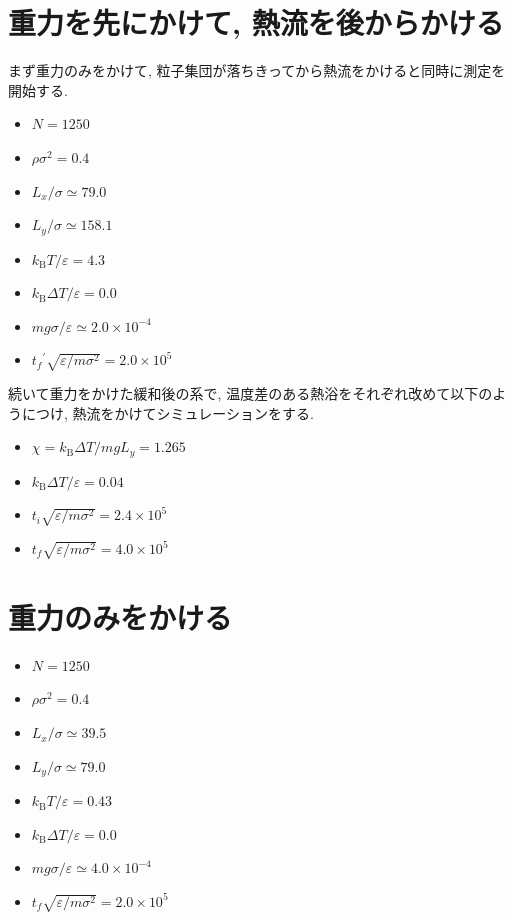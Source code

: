 


\section{重力を先にかけて, 熱流を後からかける}

まず重力のみをかけて, 粒子集団が落ちきってから熱流をかけると同時に測定を開始する.

\begin{itemize}
  \item $N = 1250$
  \item $\rho \sigma^2 = 0.4$
  \item $L_x / \sigma \simeq 79.0$
  \item $L_y / \sigma \simeq 158.1$
  \item $k_{\text{B}} T/\varepsilon = 4.3$
  \item $k_{\text{B}} \Delta T/\varepsilon = 0.0$
  \item $mg\sigma/\varepsilon \simeq 2.0 \times 10^{-4}$
  \item ${t_f}^{\prime} \sqrt{\varepsilon / m \sigma^2} = 2.0 \times 10^{5}$
\end{itemize}

続いて重力をかけた緩和後の系で, 温度差のある熱浴をそれぞれ改めて以下のようにつけ, 熱流をかけてシミュレーションをする. 

\begin{itemize}
  \item $\chi = k_{\text{B}}\Delta T / mg L_y = 1.265$
  \item $k_{\text{B}} \Delta T/\varepsilon = 0.04$
  \item $t_i \sqrt{\varepsilon / m \sigma^2} = 2.4 \times 10^{5}$
  \item $t_f \sqrt{\varepsilon / m \sigma^2} = 4.0 \times 10^{5}$
\end{itemize}





\section{重力のみをかける}

\begin{itemize}
  \item $N = 1250$
  \item $\rho {\sigma}^2 = 0.4$
  \item $L_x / \sigma \simeq 39.5$
  \item $L_y / \sigma \simeq 79.0$
  \item $k_{\text{B}} T / \varepsilon = 0.43$
  \item $k_{\text{B}} \Delta T / \varepsilon = 0.0$
  \item $mg\sigma/\varepsilon \simeq 4.0 \times 10^{-4}$
  \item $t_f \sqrt{\varepsilon / m \sigma^2} = 2.0 \times 10^{5}$
\end{itemize}

